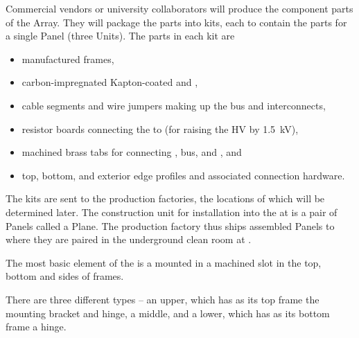Commercial vendors or university collaborators will produce the component parts of the  Array. 
They will package the parts into kits, each to contain the parts for a single  Panel (three  Units). The parts in each kit are 
\begin{itemize}
\item manufactured \frfour {} frames, %
\item carbon-impregnated Kapton-coated  and ,
\item {} cable segments and wire jumpers making up the   bus and  interconnects,
\item resistor boards connecting the  to  (for raising the  HV by \SI{1.5}{\kV}),
\item machined brass tabs for connecting ,  bus, and , and
\item top, bottom, and exterior edge profiles and associated connection hardware.
\end{itemize}
The kits are sent to the production factories, the locations of which will be determined later.  
The %
 construction unit for installation into the  at \surf is a pair of  Panels called a  Plane. The production factory thus ships assembled  Panels to \surf where they are paired in the underground clean room at \surf{}. %

The most basic element of the  
is a  mounted in a machined slot in the top, bottom and sides of \frfour frames.  







There are three different  types  -- an upper, which has as its top frame the  mounting bracket and  hinge, a middle, and a lower, which has as its bottom frame a  hinge.  

